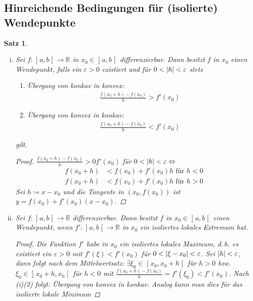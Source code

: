 \documentclass[ngerman,titlepage,twoside, parskip=half*]{scrreprt}
\newcommand*{\R}{\mathbb{R}}
\theoremstyle{break}
\newtheorem{theorem}{Satz}[section]
\theoremstyle{nonumberbreak}
\newtheorem{proof}{Beweis:}
\DeclarePairedDelimiter{\abs}{\lvert}{\rvert}
\newcommand*{\bsofint}[1]{\mathopen{]}#1\mathclose{[}} %
\begin{document}
\subsection{Hinreichende Bedingungen für (isolierte) Wendepunkte}
\begin{theorem}
  \begin{enumerate}[(i)]
  \item Sei $f\colon\bsofint{a,b}\rightarrow\R$ in
    $x_0\in\bsofint{a,b}$ differenzierbar. Dann besitzt
    $f$ in $x_0$ einen Wendepunkt, falls ein $\varepsilon>0$
    existiert und für $0<\abs{h}<\varepsilon$ stets
    \begin{enumerate}[(1)]
    \item Übergang von konkav in konvex:
      \begin{gather*}\frac{f(x_0+h)-f(x_0)}{h}>f'(x_0)\end{gather*}
    \item Übergang von konvex in konkav:
      \begin{gather*}\frac{f(x_0+h)-f(x_0)}{h}<f'(x_0)\end{gather*}
    \end{enumerate}
    gilt.
    \begin{proof}
      $\frac{f(x_0+h)-f(x_0)}{h}>0f'(x_0)$ für $0<\abs{h}
      <\varepsilon\Leftrightarrow$
      \begin{align*}
        f(x_0+h) &< f(x_0)+f'(x_0)h \text{ für } h<0\\
        f(x_0+h) &< f(x_0)+f'(x_0)h \text{ für } h>0
      \end{align*}
      Sei $h\coloneqq x-x_0$ und die 
      Tangente in $(x_0,f(x_0))$ ist $y=f(x_0)+f'(x_0)(x-x_0)$.
    \end{proof}
  \item Sei $f\colon\bsofint{a,b}\rightarrow\R$
    differenzierbar. Dann besitzt $f$ in $x_0\in\bsofint{a,b}$ einen
    Wendepunkt, wenn $f'\colon\bsofint{a,b}\rightarrow\R$
    in $x_0$ ein isoliertes lokales Extremum hat.
    \begin{proof}
      Die Funktion $f'$ habe in $x_0$ ein isoliertes lokales
      Maximum, d.\,h. es existiert ein $\varepsilon>0$ mit
      $f'(\xi)<f'(x_0)$ für $0< \abs{\xi-x_0}<\varepsilon$. Sei
      $\abs{h}<\varepsilon$, dann folgt nach dem Mittelwertsatz:
      $\exists\xi_0\in \bsofint{x_0,x_0+h}$ für $h>0$ bzw. $\xi_0\in
      \bsofint{x_0+h,x_0}$ für $h<0$ mit $\frac{f(x_0+h)-f(x_0)}{h}
      =f'(\xi_0)<f'(x_0)$. Nach (i)(2) folgt: Übergang von konvex in
      konkav. Analog kann man dies für das isolierte lokale Minimum

\end{proof}
\end{enumerate}
\end{theorem}
\end{document}
